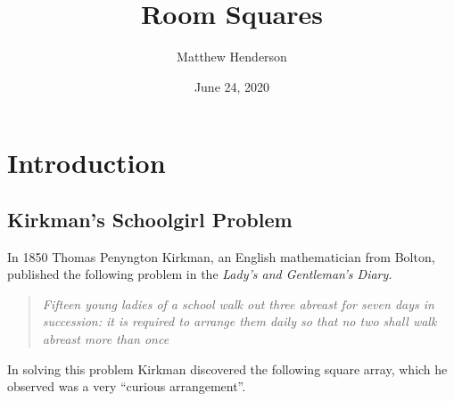 \documentclass[
  12pt,
  a4paper]{book}
\title{Room Squares}
\author{Matthew Henderson}
\date{June 24, 2020}
\begin{document}
\frontmatter
\maketitle

{
\setcounter{tocdepth}{1}
\tableofcontents
}
\mainmatter
\hypertarget{introduction}{%
\chapter{Introduction}\label{introduction}}

\hypertarget{kirkmans-schoolgirl-problem}{%
\section{Kirkman's Schoolgirl
Problem}\label{kirkmans-schoolgirl-problem}}

In 1850 Thomas Penyngton Kirkman, an English mathematician from Bolton,
published the following problem in the \emph{Lady's and Gentleman's
Diary.}

\begin{quote}
\emph{Fifteen young ladies of a school walk out three abreast for seven
days in succession: it is required to arrange them daily so that no two
shall walk abreast more than once}
\end{quote}

In solving this problem Kirkman discovered the following square array,
which he observed was a very ``curious arrangement''.
\end{document}
